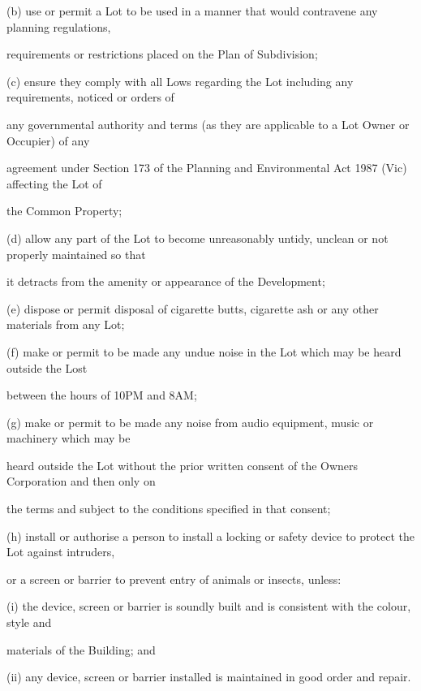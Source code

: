 \documentclass{article}
\begin{document}
{\fontsize{9.962}{1}(b) use or permit a Lot to be used in a manner that would contravene any planning regulations, }

{\fontsize{10.02}{1}requirements or restrictions placed on the Plan of Subdivision; }

{\fontsize{9.962}{1}(c) ensure they comply with all Lows regarding the Lot including any requirements, noticed or orders of }

{\fontsize{10.02}{1}any governmental authority and terms (as they are applicable to a Lot Owner or Occupier) of any }

{\fontsize{10.02}{1}agreement under Section 173 of the Planning and Environmental Act 1987 (Vic) affecting the Lot of }

{\fontsize{10.02}{1}the Common Property; }

{\fontsize{9.962}{1}(d) allow any part of the Lot to become unreasonably untidy, unclean or not properly maintained so that }

{\fontsize{10.02}{1}it detracts from the amenity or appearance of the Development; }

{\fontsize{9.962}{1}(e) dispose or permit disposal of cigarette butts, cigarette ash or any other materials from any Lot; }

{\fontsize{9.962}{1}(f) make or permit to be made any undue noise in the Lot which may be heard outside the Lost }

{\fontsize{10.02}{1}between the hours of 10PM and 8AM; }

{\fontsize{9.962}{1}(g) make or permit to be made any noise from audio equipment, music or machinery which may be }

{\fontsize{10.02}{1}heard outside the Lot without the prior written consent of the Owners Corporation and then only on }

{\fontsize{10.02}{1}the terms and subject to the conditions specified in that consent; }

{\fontsize{9.962}{1}(h) install or authorise a person to install a locking or safety device to protect the Lot against intruders, }

{\fontsize{10.02}{1}or a screen or barrier to prevent entry of animals or insects, unless: }

{\fontsize{9.962}{1}(i) the device, screen or barrier is soundly built and is consistent with the colour, style and }

{\fontsize{10.02}{1}materials of the Building; and }

{\fontsize{10.02}{1}(ii) any device, screen or barrier installed is maintained in good order and repair. }
\end{document}
